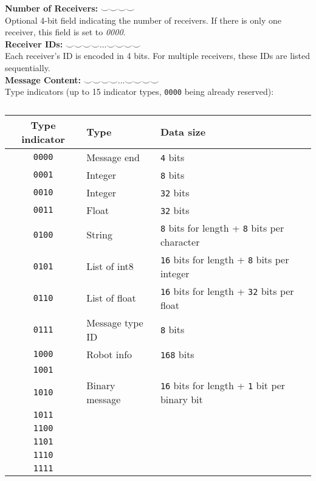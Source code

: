 \documentclass[../main.tex]{subfiles}
\begin{document}
\textbf{Number of Receivers:} $\smallsmile \smallsmile \smallsmile \smallsmile$\\
Optional 4-bit field indicating the number of receivers. If there is only one receiver, this field is set to \textit{0000}.\\

\textbf{Receiver IDs:} $\smallsmile \smallsmile \smallsmile \smallsmile \dots \smallsmile \smallsmile \smallsmile \smallsmile$\\
Each receiver's ID is encoded in 4 bits. For multiple receivers, these IDs are listed sequentially.\\

\textbf{Message Content:} $\smallsmile \smallsmile \smallsmile \smallsmile \dots \smallsmile \smallsmile \smallsmile \smallsmile$\\

Type indicators (up to 15 indicator types, \texttt{0000} being already reserved):\\
\begin{table}[H]
	\centering
	\begin{tabular}{c l l}
		\hline
		Type indicator & Type & Data size\\
		\hline
		\texttt{0000} & Message end & \texttt{4} bits\\
		\texttt{0001} & Integer & \texttt{8} bits\\
		\texttt{0010} & Integer & \texttt{32} bits\\
		\texttt{0011} & Float & \texttt{32} bits\\
		\texttt{0100} & String & \texttt{8} bits for length + \texttt{8} bits per character\\
		\texttt{0101} & List of int8 & \texttt{16} bits for length + \texttt{8} bits per integer\\
		\texttt{0110} & List of float & \texttt{16} bits for length + \texttt{32} bits per float\\
		\texttt{0111} & Message type ID & \texttt{8} bits\\
		\texttt{1000} & Robot info & \texttt{168} bits\\
		\texttt{1001} & & \\
		\texttt{1010} & Binary message & \texttt{16} bits for length + \texttt{1} bit per binary bit\\
		\texttt{1011} & & \\
		\texttt{1100} & & \\
		\texttt{1101} & & \\
		\texttt{1110} & & \\
		\texttt{1111} & & \\
		\hline
	\end{tabular}
	\caption{}
\end{table}
\end{document}
